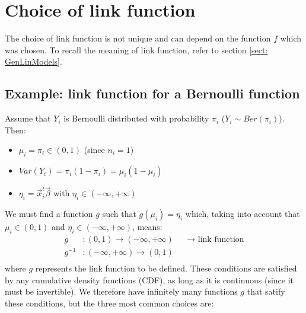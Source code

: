   \section{Choice of link function}
    The choice of link function is not unique and can depend on the function $f$
    which was chosen. To recall the meaning of link function, refer to section
    \ref*{sect: GenLinModels}.

    \subsection{Example: link function for a Bernoulli function}
      Assume that $Y_i$ is Bernoulli distributed with probability $\pi_i$ ($Y_i
      \sim Ber(\pi_i)$). Then:
      \begin{itemize}
        \item $\mu_i = \pi_i \in (0,1)$ (since $n_i = 1$)
        \item $Var(Y_i) = \pi_i(1-\pi_i) = \mu_i(1-\mu_i)$
        \item $\eta_i = \vec{x}_i^t\vec{\beta}$ with $\eta_i \in (-\infty,
        +\infty)$
      \end{itemize}
      We must find a function $g$ such that $g(\mu_i)=\eta_i$ which, taking into
      account that $\mu_i \in (0, 1)$ and $\eta_i \in (-\infty, +\infty)$,
      means:
      \begin{align*}
        g&: (0, 1) \to (-\infty, +\infty) && \longrightarrow \text{ link function} \\
        g^{-1}&: (-\infty, +\infty) \to (0, 1)  \\
      \end{align*}
      where $g$ represents the link function to be defined. These conditions are
      satisfied by any cumulative density functions (CDF), as long as it is
      continuous (since it must be invertible). We therefore have infinitely
      many functions $g$ that satify these conditions, but the three most common
      choices are:
